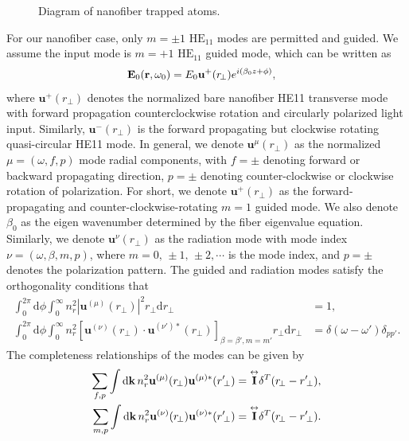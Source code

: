 \begin{figure}
\centering{}
\caption{Diagram of nanofiber trapped atoms. }
\end{figure}

For our nanofiber case, only $ m=\pm 1 $ $ \text{HE}_{11} $ modes are permitted and guided. We assume the input mode is $ m=+1 $ $ \text{HE}_{11} $ guided mode, which can be written as 
\begin{align}
\mathbf{E}_0(\mathbf{r},\omega_0)&=E_0 \mathbf{u}^+(r\!_\perp ) e^{i(\beta_0 z+\phi)}, 
\end{align}
where $ \mathbf{u}^{+}(r\!_\perp ) $ denotes the normalized bare nanofiber HE11 transverse mode with forward propagation counterclockwise rotation and circularly polarized light input. Similarly, $ \mathbf{u}^{-}(r\!_\perp ) $ is the forward propagating but clockwise rotating quasi-circular HE11 mode. In general, we denote  $ \mathbf{u}^{\mu}(r\!_\perp ) $ as the normalized $\mu=(\omega,f,p)$ mode radial components, with $ f=\pm $ denoting forward or backward propagating direction, $ p=\pm $ denoting counter-clockwise or clockwise rotation of polarization. For short, we denote $\mathbf{u}^+(r\!_\perp )$ as the forward-propagating and counter-clockwise-rotating $m=1$ guided mode. We also denote $ \beta_0 $ as the eigen wavenumber determined by the fiber eigenvalue  equation. Similarly, we denote $ \mathbf{u}^{\nu}(r\!_\perp ) $ as the radiation mode with mode index $ \nu=(\omega,\beta,m,p) $, where $ m=0,\,\pm 1,\,\pm 2,\cdots $ is the mode index, and $p=\pm$ denotes the polarization pattern. The guided and radiation modes satisfy the orthogonality conditions that 
\begin{align}
\int_0^{2\pi}\mathrm{d}\phi \int_0^\infty n_{r}^2|\mathbf{u}^{(\mu)}(r\!_\perp )|^2r\!_\perp \mathrm{d}r\!_\perp &=1,\\
\int_0^{2\pi}\mathrm{d}\phi \int_0^\infty n_{r}^2\left[\mathbf{u}^{(\nu)}(r\!_\perp )\cdot\mathbf{u}^{(\nu')*}(r\!_\perp )\right]_{\beta=\beta',m=m'}r\!_\perp \mathrm{d}r\!_\perp &=\delta(\omega-\omega')\delta_{pp'}.
\end{align}
The completeness relationships of the modes can be given by
\begin{align}
\sum_{f,p}\int \mathrm{d}\mathbf{k} \,n_r^2\mathbf{u}^{(\mu)}(r\!_\perp )\mathbf{u}^{(\mu)*}(r'\!_\perp ) &= \unittensor\delta^T(r\!_\perp-r'\!_\perp),\\
\sum_{m,p}\int \mathrm{d}\mathbf{k} \, n_r^2\mathbf{u}^{(\nu)}(r\!_\perp )\mathbf{u}^{(\nu)*}(r'\!_\perp ) &=\unittensor\delta^T(r\!_\perp-r'\!_\perp).
\end{align}

